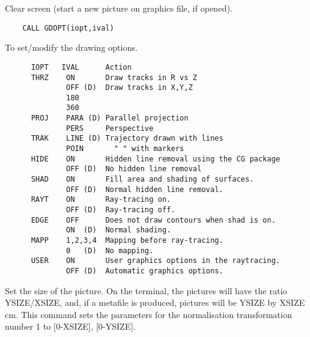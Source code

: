 \ENDCMD


   \par
Clear screen (start a new picture on graphics file, if opened).  

\ENDCMD


\BEGARG
{}
\ENDARG

\begin{verbatim}
    CALL GDOPT(iopt,ival)
\end{verbatim}
   \par
To set/modify the drawing options.  
\begin{verbatim}
      IOPT   IVAL      Action
      THRZ    ON       Draw tracks in R vs Z
              OFF (D)  Draw tracks in X,Y,Z
              180
              360
      PROJ    PARA (D) Parallel projection
              PERS     Perspective
      TRAK    LINE (D) Trajectory drawn with lines
              POIN       " " with markers
      HIDE    ON       Hidden line removal using the CG package
              OFF (D)  No hidden line removal
      SHAD    ON       Fill area and shading of surfaces.
              OFF (D)  Normal hidden line removal.
      RAYT    ON       Ray-tracing on.
              OFF (D)  Ray-tracing off.
      EDGE    OFF      Does not draw contours when shad is on.
              ON  (D)  Normal shading.
      MAPP    1,2,3,4  Mapping before ray-tracing.
              0   (D)  No mapping.
      USER    ON       User graphics options in the raytracing.
              OFF (D)  Automatic graphics options.
\end{verbatim}

\ENDCMD


\BEGARG
{}
\ENDARG

   \par
Set the size of the picture.  On the terminal, the pictures will have the 
   ratio YSIZE/XSIZE, and, if a metafile is produced, pictures will be YSIZE 
   by XSIZE cm.  This command sets the parameters for the normalisation 
   transformation number 1 to [0-XSIZE], [0-YSIZE].  

\ENDCMD

